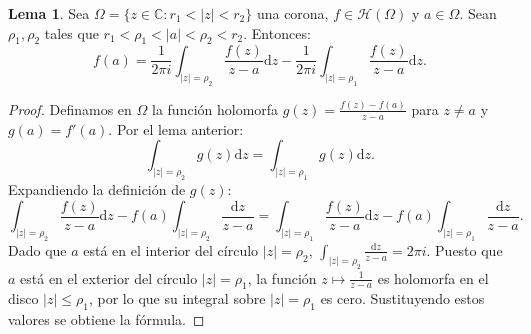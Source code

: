 \documentclass[11pt,a4paper]{article}
\theoremstyle{definition}
\newtheorem{lema}{Lema}[section]
\theoremstyle{remark}
\numberwithin{equation}{section}
\newcommand{\dz}{\mathrm{d}z}
\begin{document}
\begin{lema}
Sea $\Omega = \{z \in \mathbb{C} : r_1 < |z| < r_2\}$ una corona, $f \in \mathcal{H}(\Omega)$ y $a \in \Omega$. Sean $\rho_1, \rho_2$ tales que $r_1 < \rho_1 < |a| < \rho_2 < r_2$. Entonces:
\begin{equation}
f(a) = \frac{1}{2\pi i} \int_{|z|=\rho_2} \frac{f(z)}{z-a} \dz - \frac{1}{2\pi i} \int_{|z|=\rho_1} \frac{f(z)}{z-a} \dz.
\end{equation}
\end{lema}
\begin{proof}
Definamos en $\Omega$ la función holomorfa $g(z) = \frac{f(z)-f(a)}{z-a}$ para $z \neq a$ y $g(a) = f'(a)$. Por el lema anterior:
\[
\int_{|z|=\rho_2} g(z) \dz = \int_{|z|=\rho_1} g(z) \dz.
\]
Expandiendo la definición de $g(z)$:
\[
\int_{|z|=\rho_2} \frac{f(z)}{z-a}\dz - f(a)\int_{|z|=\rho_2}\frac{\dz}{z-a} = \int_{|z|=\rho_1} \frac{f(z)}{z-a}\dz - f(a)\int_{|z|=\rho_1}\frac{\dz}{z-a}.
\]
Dado que $a$ está en el interior del círculo $|z|=\rho_2$, $\int_{|z|=\rho_2} \frac{\dz}{z-a} = 2\pi i$. Puesto que $a$ está en el exterior del círculo $|z|=\rho_1$, la función $z \mapsto \frac{1}{z-a}$ es holomorfa en el disco $|z| \le \rho_1$, por lo que su integral sobre $|z|=\rho_1$ es cero. Sustituyendo estos valores se obtiene la fórmula.
\end{proof}
\end{document}
